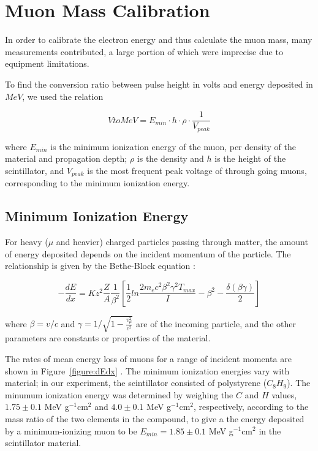 
\section{Muon Mass Calibration}\label{masscalibration}

In order to calibrate the electron energy and thus calculate the muon
mass, many measurements contributed, a large portion of which were
imprecise due to equipment limitations.

To find the conversion ratio between pulse height in volts and energy
deposited in $MeV$, we used the relation

\begin{equation} VtoMeV = E_{min}\cdot h\cdot\rho\cdot\frac{1}{V_{peak}}\end{equation}   

where $E_{min}$ is the minimum ionization energy of the muon, per
density of the material and propagation depth; $\rho$ is the density
and $h$ is the height of the scintillator, and $V_{peak}$ is the most
frequent peak voltage of through going muons, corresponding to the
minimum ionization energy.

\subsection{Minimum Ionization Energy}\label{minionizationenergy}

For heavy ($\mu$ and heavier) charged particles passing through
matter, the amount of energy deposited depends on the incident
momentum of the particle. The relationship is given by the Bethe-Block
equation \cite{yao}:

\begin{equation}
-\frac{dE}{dx} = Kz^2\frac{Z}{A}\frac{1}{\beta^2}\left[\frac{1}{2}ln\frac{2m_ec^2\beta^2\gamma^2T_{max}}{I} - \beta^2 - \frac{\delta(\beta\gamma)}{2}\right]
\end{equation}

where $\beta = v/c$ and $\gamma = 1/\sqrt{1 - \frac{v_{\mu}^2}{c^2}}$
are of the incoming particle, and the other parameters are constants
or properties of the material.

The rates of mean energy loss of muons for a range of incident momenta
are shown in Figure~\ref{figure:dEdx} \cite{yao}. The minimum
ionization energies vary with material; in our experiment, the
scintillator consisted of polystyrene ($C_8H_9$). The minumum
ionization energy was determined by weighing the $C$ and $H$ values,
$1.75\pm 0.1$ MeV g$^{-1}$cm$^{2}$ and $4.0\pm 0.1$
MeV g$^{-1}$cm$^{2}$, respectively, according to the mass ratio of the
two elements in the compound, to give a the energy deposited by a
minimum-ionizing muon to be $E_{min} = 1.85 \pm 0.1$ MeV g$^{-1}$cm$^{2}$ in the
scintillator material.

